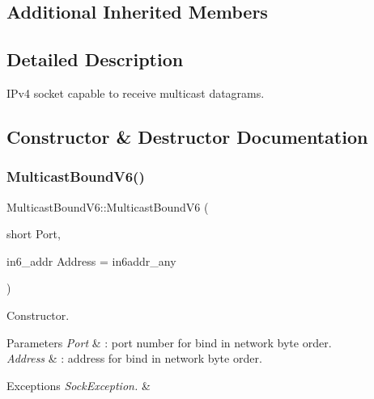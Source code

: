 \subsection*{Additional Inherited Members}


\subsection{Detailed Description}
I\+Pv4 socket capable to receive multicast datagrams. 

\subsection{Constructor \& Destructor Documentation}
\mbox{\label{classMulticastBoundV6_aeff8613d8b6c8c7e5ecbdbbc2b73bf8a}} 
\subsubsection{\texorpdfstring{Multicast\+Bound\+V6()}{MulticastBoundV6()}\hspace{0.1cm}{\footnotesize\ttfamily [1/3]}}
{\footnotesize\ttfamily Multicast\+Bound\+V6\+::\+Multicast\+Bound\+V6 (\begin{DoxyParamCaption}\item[{short}]{Port,  }\item[{in6\+\_\+addr}]{Address = {\ttfamily in6addr\+\_\+any} }\end{DoxyParamCaption})}

Constructor. 
\begin{DoxyParams}{Parameters}
{\em Port} & \+: port number for bind in network byte order. \\
\hline
{\em Address} & \+: address for bind in network byte order. \\
\hline
\end{DoxyParams}

\begin{DoxyExceptions}{Exceptions}
{\em Sock\+Exception.} & \\
\hline
\end{DoxyExceptions}
\mbox{\label{classMulticastBoundV6_a90c23a309b94b8e997dff8177a478ab2}} 
